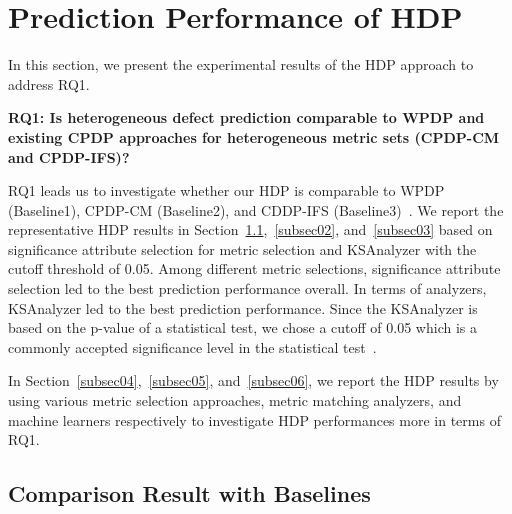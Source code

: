 \section{Prediction Performance of HDP}
\label{sec:Result}
In this section, we present the experimental results of the HDP approach to address RQ1.

{\bf RQ1: Is heterogeneous defect prediction comparable to WPDP and existing CPDP approaches for heterogeneous metric sets (CPDP-CM and CPDP-IFS)?}

RQ1 leads us to investigate whether our
HDP is comparable to WPDP (Baseline1), CPDP-CM
(Baseline2), and CDDP-IFS (Baseline3)~\cite{He14}. We report the representative HDP results in Section~\ref{subsec01},~\ref{subsec02}, and~\ref{subsec03} based on significance attribute selection for metric selection and KSAnalyzer with the cutoff threshold of 0.05. Among different
metric selections, significance attribute selection led to the best
prediction performance overall. In terms of analyzers, KSAnalyzer led to the best prediction performance.
Since the KSAnalyzer is based on the p-value of a statistical test, we chose a cutoff of 0.05 which is a commonly accepted significance level in the
statistical test~\cite{Corder09}.

In Section~\ref{subsec04},~\ref{subsec05}, and~\ref{subsec06}, we report the HDP results by using various metric selection approaches, metric matching analyzers, and machine learners respectively to investigate HDP performances more in terms of RQ1.

\subsection{Comparison Result with Baselines}
\label{subsec01}%


